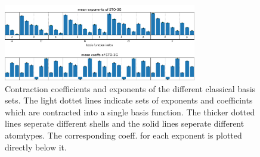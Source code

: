 \begin{figure}
    \includegraphics[width=0.75\textwidth]{chapters/results/results_images/adaptive_basis_functions/mean_exps_and_coeffsSTO-3G}
    \caption{Contraction coefficients and exponents of the different classical basis sets. The light dottet lines indicate sets of exponents and coefficints which are contracted into a single basis function. The thicker dotted lines seperate different shells and the solid lines seperate different atomtypes. The corresponding coeff. for each exponent is plotted directly below it.} \label{fig:classical_exps_coeffs}
\end{figure}

